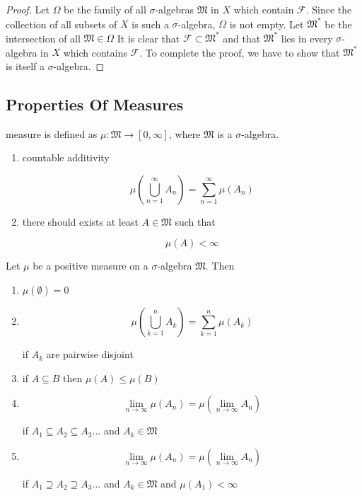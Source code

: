 \begin{proof}
     Let $\Omega$ be the family of all $\sigma$-algebras $\mathfrak { M }$ 
     in $X$ which contain $\mathscr { F }$.
     Since the collection of all subsets of $X$ is such a $\sigma$-algebra,
     $\Omega$ is not empty. Let $\mathfrak { M } ^ { \ast }$ be the intersection 
     of all $\mathfrak { M } \in \Omega$ It is clear that ${ \mathscr { F } } \subset { \mathfrak { M } } ^ { * }$ 
     and that $\mathfrak { M } ^ { \ast }$ lies in every $\sigma$-algebra 
     in $X$ which contains $\mathscr { F }$. 
     To complete the proof, we have to show that $\mathfrak { M } ^ { * }$ 
     is itself a $\sigma$-algebra.
\end{proof}

\subsection{Properties Of Measures}

\begin{definition}
    measure is defined as $\mu: \mathfrak{M} \to [0, \infty]$, where $\mathfrak{M}$ is a $\sigma$-algebra.
    \begin{enumerate}
        \item countable additivity

        \[
            \mu\left(\bigcup_{n=1}^{\infty} A_n\right) = \sum_{n=1}^{\infty}\mu(A_n)
        \]

        \item there should exists at least $A \in \mathfrak{M}$ such that

        \[
            \mu(A) < \infty
        \]
    \end{enumerate}
\end{definition}


\begin{thm}
    Let $\mu$ be a positive measure on a $\sigma$-algebra $\mathfrak{M}$. Then

    \begin{enumerate}
        \item $\mu(\emptyset) = 0$

        \item \[
            \mu\left( \bigcup_{k=1}^{n}A_k \right) = \sum_{k=1}^{n} \mu(A_k)
        \]

        if $A_k$ are pairwise disjoint

        \item if $A \subseteq B$ then $\mu(A) \le \mu(B)$

        \item \[
            \lim_{n \to \infty}\mu(A_n) = \mu\left( \lim_{n \to \infty}A_n\right)
        \]

        if $A_1 \subseteq A_2 \subseteq A_3 ...$ and $A_k \in \mathfrak{M}$


        \item \[
            \lim_{n \to \infty}\mu(A_n) = \mu\left( \lim_{n \to \infty}A_n\right)
        \]

        if $A_1 \supseteq A_2 \supseteq A_3 ...$ and $A_k \in \mathfrak{M}$ and $\mu(A_1) < \infty$
    \end{enumerate}
\end{thm}

